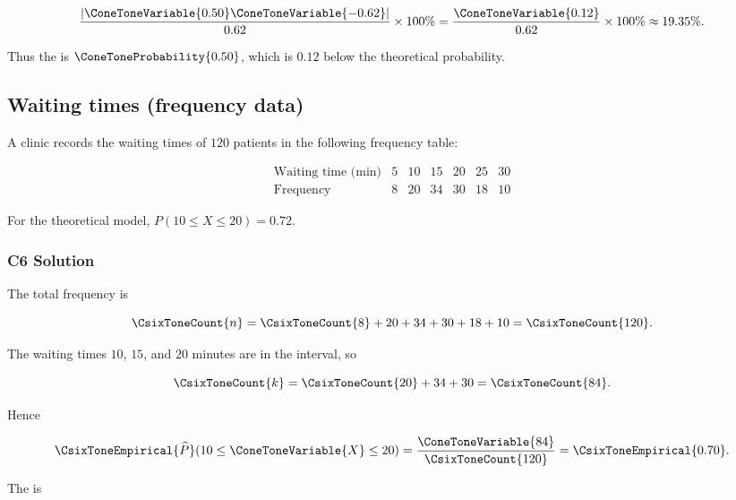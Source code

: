 \[
\frac{|\ConeToneVariable{0.50}\ConeToneVariable{-0.62}|}{0.62}\times100\%
=\frac{\ConeToneVariable{0.12}}{0.62}\times100\%
\approx19.35\%.
\]

Thus the   is $\ConeToneProbability{0.50}$, which is $0.12$ below the
theoretical probability.


\subsection{Waiting times (frequency data)}
\label{sec:c6-only-frequency}

A clinic records the waiting times of $120$ patients in the following
frequency table:

\[
\begin{array}{c|cccccc}
	\text{Waiting time (min)} & 5 & 10 & 15 & 20 & 25 & 30 \\ \hline
	\text{Frequency} & 8 & 20 & 34 & 30 & 18 & 10
\end{array}
\]

For the theoretical model,
$P(10\leq X\leq20)=0.72$.


\subsubsection*{C6 Solution}
\label{subsec:c6-only-frequency-solution}

The total frequency is

\[
\CsixToneCount{n}=\CsixToneCount{8}+20+34+30+18+10=\CsixToneCount{120}.
\]

The waiting times $10$, $15$, and $20$ minutes are in the interval, so

\[
\CsixToneCount{k}=\CsixToneCount{20}+34+30=\CsixToneCount{84}.
\]

Hence

\[
\CsixToneEmpirical{\widehat P}(10\leq \ConeToneVariable{X}\leq20)=\frac{\ConeToneVariable{84}}{\CsixToneCount{120}}=\CsixToneEmpirical{0.70}.
\]

The   is

